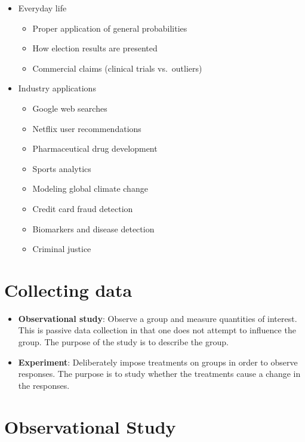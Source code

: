 \documentclass[]{tufte-handout}
\providecommand{\tightlist}{%
  \setlength{\itemsep}{0pt}\setlength{\parskip}{0pt}}
\begin{document}
\begin{itemize}
\tightlist
\item
  Everyday life

  \begin{itemize}
  \tightlist
  \item
    Proper application of general probabilities
  \item
    How election results are presented
  \item
    Commercial claims (clinical trials vs.~outliers)
  \end{itemize}
\item
  Industry applications

  \begin{itemize}
  \tightlist
  \item
    Google web searches
  \item
    Netflix user recommendations
  \item
    Pharmaceutical drug development
  \item
    Sports analytics
  \item
    Modeling global climate change
  \item
    Credit card fraud detection
  \item
    Biomarkers and disease detection
  \item
    Criminal justice
  \end{itemize}
\end{itemize}

\section{Collecting data}\label{collecting-data}

\begin{itemize}
\item
  \textbf{Observational study}: Observe a group and measure quantities
  of interest. This is passive data collection in that one does not
  attempt to influence the group. The purpose of the study is to
  describe the group.
\item
  \textbf{Experiment}: Deliberately impose treatments on groups in order
  to observe responses. The purpose is to study whether the treatments
  cause a change in the responses.
\end{itemize}

\section{Observational Study}\label{observational-study}
\end{document}
